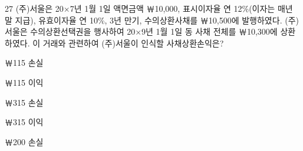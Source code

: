 \begin{question}{27}
(주)서울은 20×7년 1월 1일 액면금액 ￦10,000, 표시이자율 연 12\%(이자는 매년 말 지급), 유효이자율 연 10\%, 3년 만기, 수의상환사채를 ￦10,500에 발행하였다. (주)서울은 수의상환선택권을 행사하여 20×9년 1월 1일 동 사채 전체를 ￦10,300에 상환하였다. 이 거래와 관련하여 (주)서울이 인식할 사채상환손익은?
\begin{choices}
  \item ￦115 손실
  \item ￦115 이익
  \item ￦315 손실
  \item ￦315 이익
  \item ￦200 손실
\end{choices}
\end{question}
